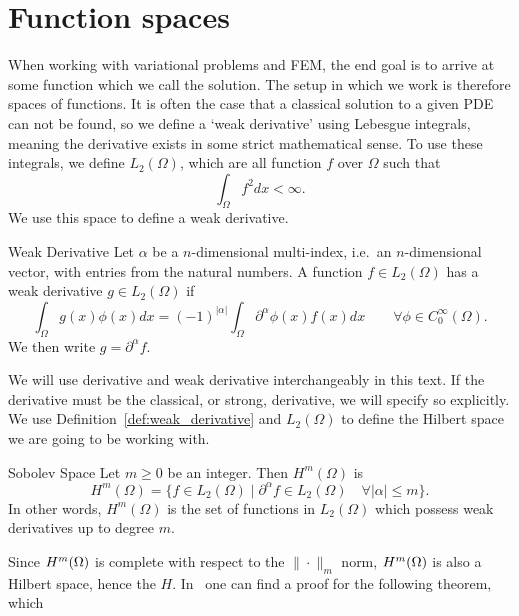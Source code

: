 \section{Function spaces}
When working with variational problems and FEM,
 the end goal is to arrive at some function which we call the solution.
The setup in which we work is therefore spaces of functions. 
It is often the case that a classical solution to a given PDE can 
not be found, 
so we define a `weak derivative' using Lebesgue integrals, meaning 
the derivative exists in some strict mathematical sense. 
To use these integrals, we define $L_2(\Omega)$, which are all 
function $f$ over $\Omega$ such that 
\begin{equation*}
   \int_\Omega f^2 dx < \infty. 
\end{equation*}
We use this space to define a weak derivative.
\begin{defn}{Weak Derivative}
   Let $\alpha$ be a $n$-dimensional multi-index, i.e.\ an $n$-dimensional vector, 
   with entries from the natural numbers.
    A function $f \in L_2(\Omega)$ has a weak derivative $g \in L_2(\Omega)$
    if
    \begin{equation*}
        \int_\Omega g(x)\phi(x) dx = {(-1)}^{|\alpha|}\int_\Omega 
        \partial ^{\alpha}\phi(x) f(x) dx
        \quad\quad \forall \phi \in C^\infty_0(\Omega).
    \end{equation*}
    We then write $g=\partial ^{\alpha}f$.\label{def:weak_derivative}
\end{defn}
We will use derivative and weak derivative interchangeably in this 
text.
If the derivative must be the classical, or strong, derivative, we will 
specify so explicitly. 
We use Definition~\ref*{def:weak_derivative} and $L_2(\Omega)$ to 
define the Hilbert space we are going to be working with. 
\begin{defn}{Sobolev Space}
   Let $m \geq 0$ be an integer. Then $H^m(\Omega)$ is 
   \begin{equation*}
    H^m(\Omega) = \{  f \in L_2(\Omega) \mid \partial ^{\alpha}f \in 
    L_2(\Omega) \quad \forall |\alpha| \leq m  \}.
   \end{equation*}
   In other words, $H^m(\Omega)$ is the set of functions in $L_2(\Omega)$ 
   which possess weak derivatives up to degree $m$.
\end{defn}
Since $H^m(\Omega)$ is complete with respect to the $\| \cdot\|_m$ norm, 
$H^m(\Omega)$ is also a Hilbert space, hence the $H$.
In~\cite{Brezis} one can find a proof for the following theorem, which 
